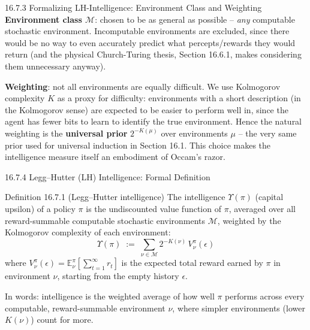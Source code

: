 \documentclass[aspectratio=169,10pt]{beamer}
\newcommand{\E}{\mathbb{E}}
\newcommand{\Mc}{\mathcal{M}}
\begin{document}
\begin{frame}{16.7.3 Formalizing LH-Intelligence: Environment Class and Weighting}
  \textbf{Environment class $\Mc$}: chosen to be as general as possible --
  \emph{any} computable stochastic environment. Incomputable environments
  are excluded, since there would be no way to even accurately predict
  what percepts/rewards they would return (and the physical Church-Turing
  thesis, Section 16.6.1, makes considering them unnecessary anyway).

  \vspace{0.3em}
  \textbf{Weighting}: not all environments are equally difficult. We use
  Kolmogorov complexity $K$ as a proxy for difficulty: environments with a
  short description (in the Kolmogorov sense) are expected to be easier to
  perform well in, since the agent has fewer bits to learn to identify the
  true environment. Hence the natural weighting is the \textbf{universal
  prior} $2^{-K(\mu)}$ over environments $\mu$ -- the very same prior used
  for universal induction in Section 16.1. This choice makes the
  intelligence measure itself an embodiment of Occam's razor.
\end{frame}

\begin{frame}{16.7.4 Legg--Hutter (LH) Intelligence: Formal Definition}
  \begin{block}{Definition 16.7.1 (Legg--Hutter intelligence)}
    The intelligence $\Upsilon(\pi)$ (capital upsilon) of a policy $\pi$ is
    the undiscounted value function of $\pi$, averaged over all
    reward-summable computable stochastic environments $\Mc$, weighted by
    the Kolmogorov complexity of each environment:
    \[
      \Upsilon(\pi) \;:=\; \sum_{\nu \in \Mc} 2^{-K(\nu)}\, V^\pi_\nu(\epsilon)
    \]
    where $V^\pi_\nu(\epsilon) = \E^\pi_\nu\!\left[\sum_{t=1}^\infty
    r_t\right]$ is the expected total reward earned by $\pi$ in environment
    $\nu$, starting from the empty history $\epsilon$.
  \end{block}
  \small
  In words: intelligence is the weighted average of how well $\pi$ performs
  across every computable, reward-summable environment $\nu$, where
  simpler environments (lower $K(\nu)$) count for more.
\end{frame}
\end{document}
